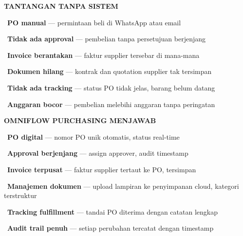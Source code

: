 \documentclass[a4paper]{article}
\begin{document}
\noindent
\begin{minipage}[t]{0.485\textwidth}
    \colorbox{RedLight}{%
        \begin{minipage}{\dimexpr\textwidth-2\fboxsep\relax}
            {\fontsize{10}{13}\selectfont\bfseries\color{RedText} TANTANGAN TANPA SISTEM}
        \end{minipage}}\par
    \vspace{4pt}

    {\fontsize{9.5}{13}\selectfont\color{TextDark}%
    \textbullet\ \textbf{PO manual} --- permintaan beli di WhatsApp atau email\par\vspace{4pt}%
    \textbullet\ \textbf{Tidak ada approval} --- pembelian tanpa persetujuan berjenjang\par\vspace{4pt}%
    \textbullet\ \textbf{Invoice berantakan} --- faktur supplier tersebar di mana-mana\par\vspace{4pt}%
    \textbullet\ \textbf{Dokumen hilang} --- kontrak dan quotation supplier tak tersimpan\par\vspace{4pt}%
    \textbullet\ \textbf{Tidak ada tracking} --- status PO tidak jelas, barang belum datang\par\vspace{4pt}%
    \textbullet\ \textbf{Anggaran bocor} --- pembelian melebihi anggaran tanpa peringatan}%
\end{minipage}%
\hfill%
\begin{minipage}[t]{0.485\textwidth}
    \colorbox{OrangePrimary}{%
        \begin{minipage}{\dimexpr\textwidth-2\fboxsep\relax}
            {\fontsize{10}{13}\selectfont\bfseries\color{White} OMNIFLOW PURCHASING MENJAWAB}
        \end{minipage}}\par
    \vspace{4pt}

    {\fontsize{9.5}{13}\selectfont\color{TextDark}%
    \textbullet\ \textbf{PO digital} --- nomor PO unik otomatis, status real-time\par\vspace{4pt}%
    \textbullet\ \textbf{Approval berjenjang} --- assign approver, audit timestamp\par\vspace{4pt}%
    \textbullet\ \textbf{Invoice terpusat} --- faktur supplier tertaut ke PO, tersimpan\par\vspace{4pt}%
    \textbullet\ \textbf{Manajemen dokumen} --- upload lampiran ke penyimpanan cloud, kategori terstruktur\par\vspace{4pt}%
    \textbullet\ \textbf{Tracking fulfillment} --- tandai PO diterima dengan catatan lengkap\par\vspace{4pt}%
    \textbullet\ \textbf{Audit trail penuh} --- setiap perubahan tercatat dengan timestamp}%
\end{minipage}
\end{document}
